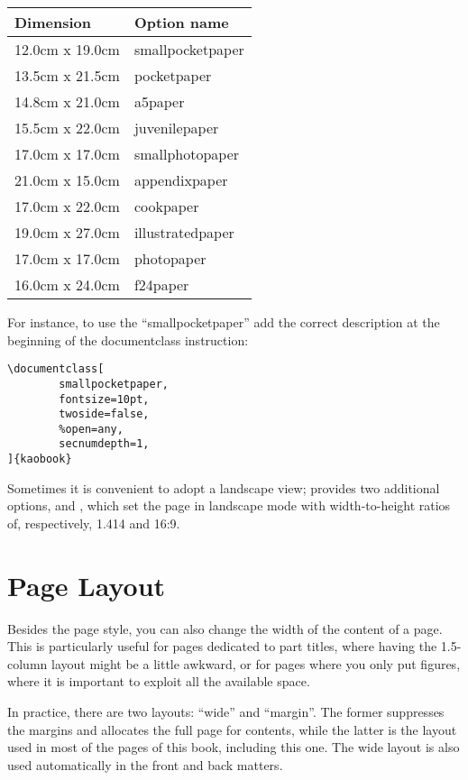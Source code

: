 \begin{margintable}[*-6]
	\caption{Some non-standard paper sizes supported by kaobook.}
	\begin{tabular}{ll}
		\toprule
		Dimension & Option name \\
		\midrule
		12.0cm x 19.0cm & smallpocketpaper \\
		13.5cm x 21.5cm & pocketpaper \\
		14.8cm x 21.0cm & a5paper \\
		15.5cm x 22.0cm & juvenilepaper \\
		17.0cm x 17.0cm & smallphotopaper \\
		21.0cm x 15.0cm & appendixpaper \\
		17.0cm x 22.0cm & cookpaper \\
		19.0cm x 27.0cm & illustratedpaper \\
		17.0cm x 17.0cm & photopaper \\
		16.0cm x 24.0cm & f24paper \\
		\bottomrule
	\end{tabular}
\end{margintable}

For instance, to use the \enquote{smallpocketpaper} add the correct 
description at the beginning of the documentclass instruction:
\begin{lstlisting}
\documentclass[
		smallpocketpaper,
		fontsize=10pt,
		twoside=false,
		%open=any,
		secnumdepth=1,
]{kaobook}
\end{lstlisting}

Sometimes it is convenient to adopt a landscape view;  
provides two additional options,  and 
, which set the page in landscape mode with 
width-to-height ratios of, respectively, 1.414 and 16:9.

\section{Page Layout}

Besides the page style, you can also change the width of the content of 
a page. This is particularly useful for pages dedicated to part titles, 
where having the 1.5-column layout might be a little awkward, or for 
pages where you only put figures, where it is important to exploit all 
the available space.

In practice, there are two layouts: \enquote{wide} and \enquote{margin}. 
The former suppresses the margins and allocates the full page for 
contents, while the latter is the layout used in most of the pages of 
this book, including this one. The wide layout is also used 
automatically in the front and back matters.

